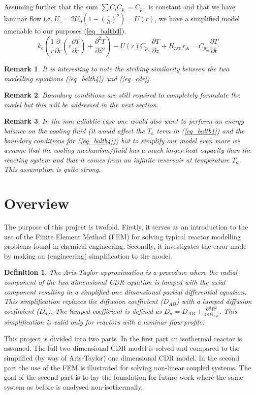 \documentclass[11pt,fleqn]{article}
\theoremstyle{defstyle}
\newtheorem{defn}{Definition}[section]
\newtheorem{rmrk}{Remark}[section]
\begin{document}
Assuming further that the sum $\sum C_i C_{p_i} = C_{p_m}$ is constant and that we have laminar flow i.e. $U_z = 2U_0(1-(\frac{r}{R})^2) = U(r)$, we have a simplified model amenable to our purposes (\ref{eq_baltb4}).
\begin{equation}
k_e\left(\frac{1}{r}\frac{\partial}{\partial r}\left(r\frac{\partial T}{\partial r}\right) + \frac{\partial ^2 T}{\partial z^2}\right) - U(r) C_{p_m} \frac{\partial T}{\partial z} + H_{rxn}r_A = C_{p_m} \frac{\partial T}{\partial t}
\label{eq_baltb4}
\end{equation}
\begin{rmrk}
It is interesting to note the striking similarity between the two modelling equations (\ref{eq_baltb4}) and (\ref{eq_cdr}).
\end{rmrk}
\begin{rmrk}
Boundary conditions are still required to completely formulate the model but this will be addressed in the next section.
\end{rmrk}
\begin{rmrk}
In the non-adiabtic case one would also want to perform an energy balance on the cooling fluid (it would affect the $T_a$ term in (\ref{eq_baltb1}) and the boundary conditions for (\ref{eq_baltb4})) but to simplify our model even more we assume that the cooling mechanism/fluid has a much larger heat capacity than the reacting system and that it comes from an infinite reservoir at temperature $T_a$. This assumption is quite strong.
\end{rmrk}

\section{Overview}
The purpose of this project is twofold. Firstly, it serves as an introduction to the use of the Finite Element Method (FEM) for solving typical reactor modelling problems found in chemical engineering. Secondly, it investigates the error made by making an (engineering) simplification to the model.
\begin{defn}
The Aris-Taylor approximation is a procedure where the radial component of the two dimensional CDR equation is lumped with the axial component resulting in a simplified one dimensional partial differential equation. This simplification replaces the diffusion coefficient ($D_{AB}$) with a lumped diffusion coefficient ($D_a$). The lumped coefficient is defined as $D_a = D_{AB} + \frac{U^2R^2}{48D_{AB}}$. This simplification is valid only for reactors with a laminar flow profile. 
\end{defn}
This project is divided into two parts. In the first part an isothermal reactor is assumed. The full two dimensional CDR model is solved and compared to the simplified (by way of Aris-Taylor) one dimensional CDR model. In the second part the use of the FEM is illustrated for solving non-linear coupled systems. The goal of the second part is to lay the foundation for future work where the same system as before is analysed non-isothermally.
\end{document}
